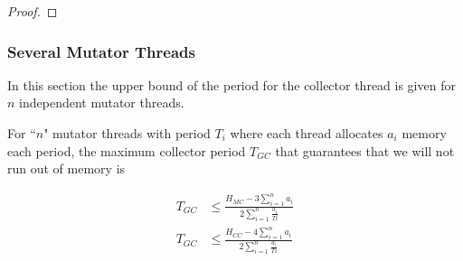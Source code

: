 \begin{proof}
%
%


%
%
%
%
%

\end{proof}

\subsubsection{Several Mutator Threads}

In this section the upper bound of the period for the collector
thread is given for $n$ independent mutator threads.

\begin{theorem}
\label{sch:theorem}

For ``$n$" mutator threads with period $T_i$ where each thread
allocates $a_i$ memory each period, the maximum collector period
$T_{GC}$ that guarantees that we will not run out of memory is

\begin{align}\label{nth:mc:theorem}
    T_{GC} & \le \frac{H_{MC}-3\sum_{i=1}^{n} a_i}{2\sum_{i=1}^{n} \frac{a_i}{Ti}}\\
    \label{nth:cc:theorem}
    T_{GC} & \le \frac{H_{CC}-4\sum_{i=1}^{n} a_i}{2\sum_{i=1}^{n}
    \frac{a_i}{Ti}}
\end{align}

\end{theorem}

